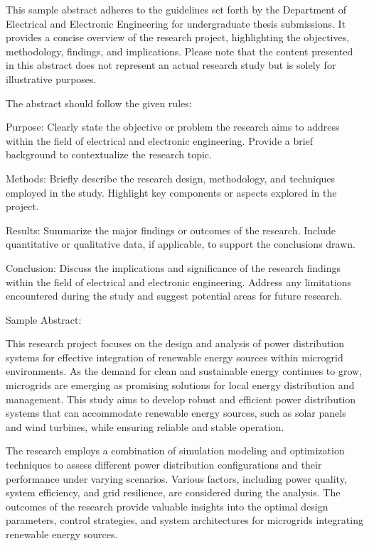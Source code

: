 
This sample abstract adheres to the guidelines set forth by the Department of Electrical and Electronic Engineering for undergraduate thesis submissions. It provides a concise overview of the research project, highlighting the objectives, methodology, findings, and implications. Please note that the content presented in this abstract does not represent an actual research study but is solely for illustrative purposes.

The abstract should follow the given rules:

Purpose: Clearly state the objective or problem the research aims to address within the field of electrical and electronic engineering. Provide a brief background to contextualize the research topic.

Methods: Briefly describe the research design, methodology, and techniques employed in the study. Highlight key components or aspects explored in the project.

Results: Summarize the major findings or outcomes of the research. Include quantitative or qualitative data, if applicable, to support the conclusions drawn.

Conclusion: Discuss the implications and significance of the research findings within the field of electrical and electronic engineering. Address any limitations encountered during the study and suggest potential areas for future research.

Sample Abstract:

This research project focuses on the design and analysis of power distribution systems for effective integration of renewable energy sources within microgrid environments. As the demand for clean and sustainable energy continues to grow, microgrids are emerging as promising solutions for local energy distribution and management. This study aims to develop robust and efficient power distribution systems that can accommodate renewable energy sources, such as solar panels and wind turbines, while ensuring reliable and stable operation.

The research employs a combination of simulation modeling and optimization techniques to assess different power distribution configurations and their performance under varying scenarios. Various factors, including power quality, system efficiency, and grid resilience, are considered during the analysis. The outcomes of the research provide valuable insights into the optimal design parameters, control strategies, and system architectures for microgrids integrating renewable energy sources.

